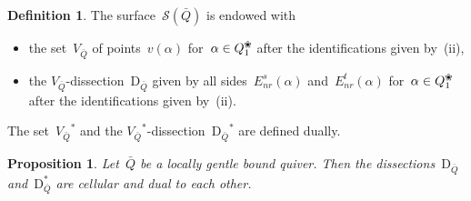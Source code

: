 \documentclass{amsart}
\newtheorem{proposition}[theorem]{Proposition}
\theoremstyle{definition}
\newtheorem{definition}[theorem]{Definition}
\newcommand{\blossom}{^\text{\ding{96}}} %
\newcommand{\Enrs}[1]{E_{nr}^{s}(#1)}
\newcommand{\Enrt}[1]{E_{nr}^{t}(#1)}
\newcommand{\surface}{\mathcal{S}} %
\newcommand{\dual}{^*} %
\newcommand{\dissection}{\mathrm{D}} %
\begin{document}
\begin{definition}
\label{def:dissectionQuiver}
The surface~$\surface(\bar Q)$ is endowed with
\begin{itemize}
\item the set~$V_{\bar Q}$ of points~$v(\alpha)$ for~$\alpha \in Q_1\blossom$ after the identifications given by~(ii),
\item the $V_{\bar Q}$-dissection~$\dissection_{\bar Q}$ given by all sides~$\Enrs{\alpha}$ and~$\Enrt{\alpha}$ for~$\alpha \in Q_1\blossom$ after the identifications given by~(ii).
\end{itemize}
The set~${V_{\bar Q}}\dual$ and the ${V_{\bar Q}}\dual$-dissection~${\dissection_{\bar Q}}\dual$ are defined dually.
\end{definition}

\begin{proposition}
\label{prop:dissectionsAreCellular}
Let~$\bar Q$ be a locally gentle bound quiver.
Then the dissections~$\dissection_{\bar Q}$ and~$\dissection_{\bar Q}\dual$ are cellular and dual to each other.
\end{proposition}
\end{document}
